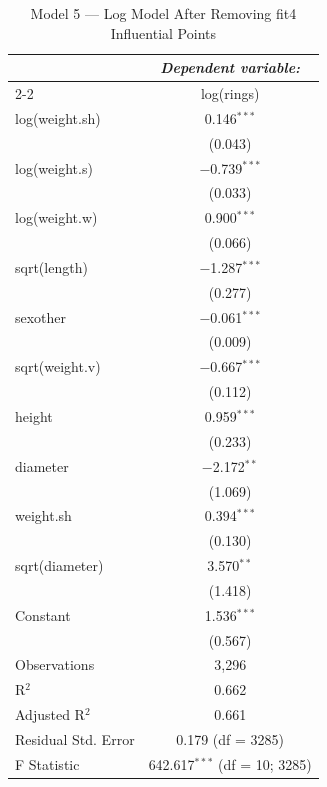 \documentclass[12pt]{article}
\begin{document}
	\begin{table}[!htbp]
		\centering
		\caption{Model 5 — Log Model After Removing fit4 Influential Points}
		\label{tab:fit5}
		\begin{tabular}{@{\extracolsep{5pt}}lc}
			\toprule
			& \multicolumn{1}{c}{\textit{Dependent variable:}} \\
			\cmidrule(lr){2-2}
			& log(rings) \\
			\midrule
			log(weight.sh) & 0.146$^{***}$ \\ 
			& (0.043) \\[0.4ex]
			log(weight.s)  & $-$0.739$^{***}$ \\ 
			& (0.033) \\[0.4ex]
			log(weight.w)  & 0.900$^{***}$ \\ 
			& (0.066) \\[0.4ex]
			sqrt(length)   & $-$1.287$^{***}$ \\ 
			& (0.277) \\[0.4ex]
			sexother       & $-$0.061$^{***}$ \\ 
			& (0.009) \\[0.4ex]
			sqrt(weight.v) & $-$0.667$^{***}$ \\ 
			& (0.112) \\[0.4ex]
			height         & 0.959$^{***}$ \\ 
			& (0.233) \\[0.4ex]
			diameter       & $-$2.172$^{**}$ \\ 
			& (1.069) \\[0.4ex]
			weight.sh      & 0.394$^{***}$ \\ 
			& (0.130) \\[0.4ex]
			sqrt(diameter) & 3.570$^{**}$ \\ 
			& (1.418) \\[0.4ex]
			Constant       & 1.536$^{***}$ \\ 
			& (0.567) \\[0.4ex]
			\midrule
			Observations        & 3,296 \\ 
			R$^{2}$             & 0.662 \\ 
			Adjusted R$^{2}$    & 0.661 \\ 
			Residual Std. Error & 0.179 (df = 3285) \\ 
			F Statistic         & 642.617$^{***}$ (df = 10; 3285) \\ 
			\bottomrule
		\end{tabular}
	\end{table}
	
\end{document}
